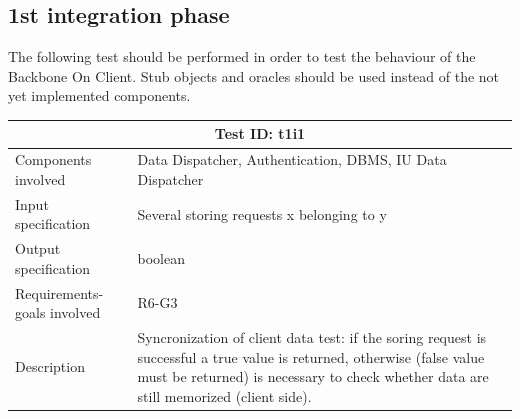 \subsection{1st integration phase}
The following test should be performed in order to test the behaviour of the Backbone On Client. Stub objects and oracles should be used instead of the not yet implemented components.

\begin{table}[H]
\centering
\begin{tabular}{ |p{4.5cm}||p{11cm}|  }
 \hline
 \multicolumn{2}{|c|}{Test ID: t1i1} \\
 
 \hline 
 Components involved  	& 	 Data Dispatcher, Authentication, DBMS, IU Data Dispatcher\\
 Input specification  	& 	 Several storing requests x belonging to y\\
Output specification  	& boolean\\
Requirements-goals involved & R6-G3\\
Description  	& 	Syncronization of client data test: if the soring request is successful a true value is returned, otherwise (false value must be returned) is necessary to check whether data are still memorized (client side).\\
 \hline
\end{tabular}
\end{table}



